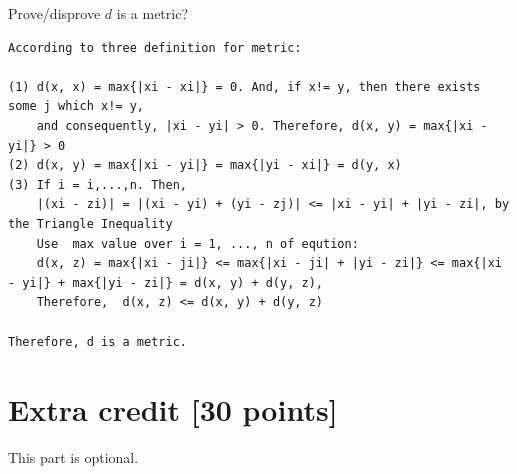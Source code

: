 \documentclass{article}
\begin{document}
Prove/disprove $d$ is a metric?

\begin{verbatim}
According to three definition for metric:

(1) d(x, x) = max{|xi - xi|} = 0. And, if x!= y, then there exists some j which x!= y, 
    and consequently, |xi - yi| > 0. Therefore, d(x, y) = max{|xi - yi|} > 0 
(2) d(x, y) = max{|xi - yi|} = max{|yi - xi|} = d(y, x)
(3) If i = i,...,n. Then, 
    |(xi - zi)| = |(xi - yi) + (yi - zj)| <= |xi - yi| + |yi - zi|, by the Triangle Inequality 
    Use  max value over i = 1, ..., n of eqution:
    d(x, z) = max{|xi - ji|} <= max{|xi - ji| + |yi - zi|} <= max{|xi - yi|} + max{|yi - zi|} = d(x, y) + d(y, z), 
    Therefore,  d(x, z) <= d(x, y) + d(y, z)
    
Therefore, d is a metric.

\end{verbatim}

\pagebreak


\section*{Extra credit [30 points]}

This part is optional. 
\end{document}
